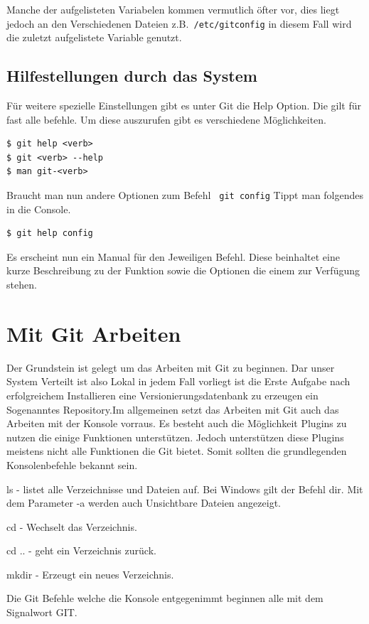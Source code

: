 \documentclass[12pt,a4paper,bibliography=totocnumbered,listof=totocnumbered]{scrartcl}
\begin{document}
Manche der aufgelisteten Variabelen kommen vermutlich öfter vor, dies liegt jedoch an den Verschiedenen Dateien z.B.\lstinline| /etc/gitconfig| in diesem Fall wird die zuletzt aufgelistete Variable genutzt.
\newpage
\subsection{Hilfestellungen durch das System}
Für weitere spezielle Einstellungen gibt es unter Git die Help Option.
Die gilt für fast alle befehle. Um diese auszurufen gibt es verschiedene Möglichkeiten.
\begin{lstlisting}
$ git help <verb>
$ git <verb> --help
$ man git-<verb>
\end{lstlisting} 

Braucht man nun andere Optionen zum Befehl \lstinline| git config| Tippt man folgendes in die Console.
\begin{lstlisting}
$ git help config
\end{lstlisting}
Es erscheint nun ein Manual für den Jeweiligen Befehl. Diese beinhaltet eine kurze Beschreibung zu der Funktion sowie die Optionen die einem zur Verfügung stehen.  
  






\section{Mit Git Arbeiten }

Der Grundstein ist gelegt um das Arbeiten mit Git zu beginnen. Dar unser System Verteilt ist also Lokal in jedem Fall vorliegt ist die Erste Aufgabe nach erfolgreichem Installieren eine Versionierungsdatenbank zu erzeugen ein Sogenanntes Repository.Im allgemeinen setzt das Arbeiten mit Git auch das Arbeiten mit der Konsole vorraus. Es besteht auch die Möglichkeit Plugins zu nutzen die einige Funktionen unterstützen. Jedoch unterstützen diese Plugins meistens nicht alle Funktionen die Git bietet. Somit sollten die grundlegenden Konsolenbefehle bekannt sein.  
\begin{compactitem}
	\item ls - listet alle Verzeichnisse und Dateien 	auf. Bei Windows gilt der Befehl dir. Mit dem Parameter -a werden auch Unsichtbare Dateien angezeigt. 
	\item cd - Wechselt das Verzeichnis.
	\item cd .. - geht ein Verzeichnis zurück.
	\item mkdir - Erzeugt ein neues Verzeichnis. 
\end{compactitem}
Die Git Befehle welche die Konsole entgegenimmt beginnen alle mit dem Signalwort GIT.  
\newpage 
\end{document}
